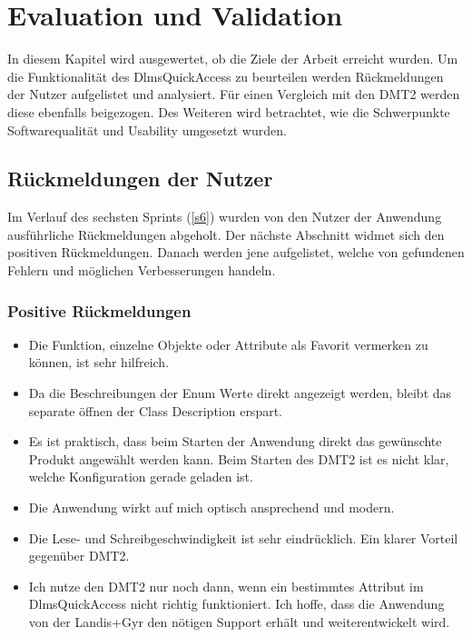 
\chapter{Evaluation und Validation}\label{eval}
In diesem Kapitel wird ausgewertet, ob die Ziele der Arbeit erreicht wurden.
Um die Funktionalität des DlmsQuickAccess zu beurteilen werden Rückmeldungen der Nutzer aufgelistet und analysiert.
Für einen Vergleich mit den \ac{DMT2} werden diese ebenfalls beigezogen.
Des Weiteren wird betrachtet, wie die Schwerpunkte Softwarequalität und Usability umgesetzt wurden.



\section{Rückmeldungen der Nutzer}\label{feedback}
Im Verlauf des sechsten Sprints (\ref{s6}) wurden von den Nutzer der Anwendung ausführliche Rückmeldungen abgeholt.
Der nächste Abschnitt widmet sich den positiven Rückmeldungen.
Danach werden jene aufgelistet, welche von gefundenen Fehlern und möglichen Verbesserungen handeln.
\subsection{Positive Rückmeldungen}

\begin{itemize}
   \item Die Funktion, einzelne Objekte oder Attribute als Favorit vermerken zu können, ist sehr hilfreich.
   \item Da die Beschreibungen der Enum Werte direkt angezeigt werden, bleibt das separate öffnen der Class Description erspart.
   \item Es ist praktisch, dass beim Starten der Anwendung direkt das gewünschte Produkt angewählt werden kann. Beim Starten des \ac{DMT2} ist es nicht klar, welche Konfiguration gerade geladen ist.
   \item Die Anwendung wirkt auf mich optisch ansprechend und modern.
   \item Die Lese- und Schreibgeschwindigkeit ist sehr eindrücklich. Ein klarer Vorteil gegenüber \ac{DMT2}.
   \item Ich nutze den \ac{DMT2} nur noch dann, wenn ein bestimmtes Attribut im DlmsQuickAccess nicht richtig funktioniert. Ich hoffe, dass die Anwendung von der Landis+Gyr den nötigen Support erhält und weiterentwickelt wird.
\end{itemize}

